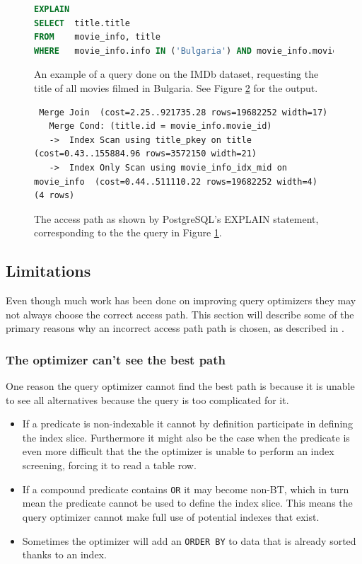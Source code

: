 \begin{figure}[ht]
\begin{lstlisting}[language=SQL]
EXPLAIN
SELECT  title.title
FROM    movie_info, title
WHERE   movie_info.info IN ('Bulgaria') AND movie_info.movie_id=title.id;
\end{lstlisting}
\caption[An example query to EXPLAIN]{An example of a query done on the IMDb dataset, requesting the title of all movies filmed in Bulgaria. See Figure \ref{fig:sql:explaintrace} for the output.}\label{fig:sql:explainquery}
\end{figure}

\begin{figure}[ht]
\begin{lstlisting}
 Merge Join  (cost=2.25..921735.28 rows=19682252 width=17)
   Merge Cond: (title.id = movie_info.movie_id)
   ->  Index Scan using title_pkey on title  (cost=0.43..155884.96 rows=3572150 width=21)
   ->  Index Only Scan using movie_info_idx_mid on movie_info  (cost=0.44..511110.22 rows=19682252 width=4)
(4 rows)
\end{lstlisting}
\caption[An example of an EXPLAIN trace]{The access path as shown by PostgreSQL's EXPLAIN statement, corresponding to the the query in Figure \ref{fig:sql:explainquery}.}\label{fig:sql:explaintrace}
\end{figure}

\subsection{Limitations}
Even though much work has been done on improving query optimizers they may not always choose the correct access path. This section will describe some of the primary reasons why an incorrect access path path is chosen, as described in \cite[Ch. 14]{lahdenmaki_2005_relational_rdidatodossea}.

\subsubsection{The optimizer can't see the best path}
One reason the query optimizer cannot find the best path is because it is unable to see all alternatives because the query is too complicated for it.

\begin{itemize}
    \item If a predicate is non-indexable it cannot by definition participate in defining the index slice. Furthermore it might also be the case when the predicate is even more difficult that the the optimizer is unable to perform an index screening, forcing it to read a table row.
    \item If a compound predicate contains \texttt{OR} it may become non-BT, which in turn mean the predicate cannot be used to define the index slice. This means the query optimizer cannot make full use of potential indexes that exist.
    \item Sometimes the optimizer will add an \texttt{ORDER BY} to data that is already sorted thanks to an index. 
\end{itemize}

